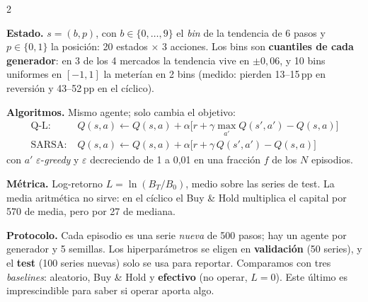 \documentclass[10pt,a4paper]{article}
\newcommand{\sect}[1]{\par\vspace{3pt}{\large\bfseries #1}\par\vspace{1pt}}
\begin{document}
\begin{multicols}{2}

\sect{1. Planteamiento}
\textbf{Estado.} $s=(b,p)$, con $b\in\{0,\dots,9\}$ el \emph{bin} de la tendencia de 6 pasos y $p\in\{0,1\}$ la posición: 20 estados $\times$ 3 acciones.
Los bins son \textbf{cuantiles de cada generador}: en 3 de los 4 mercados la tendencia vive en $\pm0{,}06$, y 10 bins uniformes en $[-1,1]$ la meterían en 2 bins
(medido: pierden 13--15\,pp en reversión y 43--52\,pp en el cíclico).

\textbf{Algoritmos.} Mismo agente; solo cambia el objetivo:
\begin{align*}
\text{Q-L:}\;& Q(s,a)\leftarrow Q(s,a)+\alpha\big[r+\gamma\max_{a'}Q(s',a')-Q(s,a)\big]\\
\text{SARSA:}\;& Q(s,a)\leftarrow Q(s,a)+\alpha\big[r+\gamma\,Q(s',a')-Q(s,a)\big]
\end{align*}
con $a'$ $\varepsilon$-\emph{greedy} y $\varepsilon$ decreciendo de 1 a 0,01 en una fracción $f$ de los $N$ episodios.

\textbf{Métrica.} Log-retorno $L=\ln(B_T/B_0)$, medio sobre las series de test. La media aritmética no sirve: en el cíclico el Buy \& Hold multiplica el capital por 570 de media, pero por 27 de mediana.

\textbf{Protocolo.} Cada episodio es una serie \emph{nueva} de 500 pasos; hay un agente por generador y 5 semillas. Los hiperparámetros se eligen en \textbf{validación} (50 series), y el \textbf{test} (100 series nuevas) solo se usa para reportar.
Comparamos con tres \emph{baselines}: aleatorio, Buy \& Hold y \textbf{efectivo} (no operar, $L=0$). Este último es imprescindible para saber si operar aporta algo.


\end{multicols}
\end{document}
